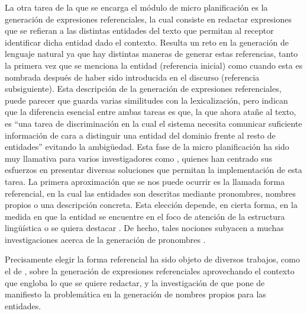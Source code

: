La otra tarea de la que se encarga el módulo de micro planificación es la generación de expresiones referenciales, la cual consiste en redactar expresiones que se refieran a las distintas entidades del texto que permitan al receptor identificar dicha entidad dado el contexto. Resulta un reto en la generación de lenguaje natural ya que hay distintas maneras de generar estas referencias, tanto la primera vez que se menciona la entidad (referencia inicial) como cuando esta es nombrada después de haber sido introducida en el discurso (referencia subsiguiente). Esta descripción de la generación de expresiones referenciales, puede parecer que guarda varias similitudes con la lexicalización, pero \cite{biblia} indican que la diferencia esencial entre ambas tareas es que, la que ahora atañe al texto, es ``una tarea de discriminación en la cual el sistema necesita comunicar suficiente información de cara a distinguir una entidad del dominio frente al resto de entidades'' evitando la ambigüedad. Esta fase de la micro planificación ha sido muy llamativa para varios investigadores como \cite{siddharthan2011information}, quienes han centrado sus esfuerzos en presentar diversas soluciones que permitan la implementación de esta tarea. La primera aproximación que se nos puede ocurrir es la llamada forma referencial, en la cual las entidades son descritas mediante pronombres, nombres propios o una descripción concreta. Esta elección depende, en cierta forma, en la medida en que la entidad se encuentre en el foco de atención de la estructura lingüística o se quiera destacar \citep{poesio2004centering}. De hecho, tales nociones subyacen a muchas investigaciones acerca de la generación de pronombres \citep{mccoy1999generating, callaway2002narrative, kibble2004optimizing}.

Precisamente elegir la forma referencial ha sido objeto de diversos trabajos, como el de \cite{belz2009generating}, sobre la generación de expresiones referenciales aprovechando el contexto que engloba lo que se quiere redactar, y la investigación de \cite{ferreira2017linguistic} que pone de manifiesto la problemática en la generación de nombres propios para las entidades.

